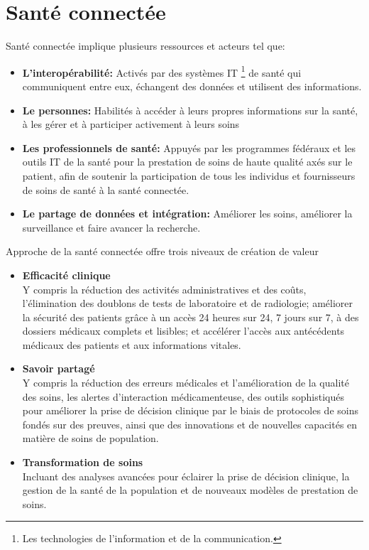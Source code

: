 \documentclass[12pt]{article}
\begin{document}
\section{Santé connectée}
Santé connectée implique plusieurs ressources et acteurs tel que:
\begin{itemize}
	\item \textbf{L’interopérabilité:} Activés par des systèmes IT \footnote{Les technologies de l'information et de la communication.} de santé qui communiquent entre eux, échangent des données et utilisent des informations.
	\item \textbf{Le personnes:} Habilités à accéder à leurs propres informations sur la santé, à les gérer et à participer activement à leurs soins
	\item \textbf{Les professionnels de santé:} Appuyés par les programmes fédéraux et les outils IT de la santé pour la prestation de soins de haute qualité axés sur le patient, afin de soutenir la participation de tous les individus et fournisseurs de soins de santé à la santé connectée.
	\item \textbf{Le partage de données et intégration:} Améliorer les soins, améliorer la surveillance et faire avancer la recherche.
\end{itemize}

Approche de la santé connectée offre trois niveaux de création de valeur
\begin{itemize}
	\item \textbf{Efficacité clinique}\\
	Y compris la réduction des activités administratives et des coûts, l’élimination des doublons de tests de laboratoire et de radiologie; améliorer la sécurité des patients grâce à un accès 24 heures sur 24, 7 jours sur 7, à des dossiers médicaux complets et lisibles; et accélérer l'accès aux antécédents médicaux des patients et aux informations vitales.
	\item \textbf{Savoir partagé}\\
	Y compris la réduction des erreurs médicales et l'amélioration de la qualité des soins, les alertes d'interaction médicamenteuse, des outils sophistiqués pour améliorer la prise de décision clinique par le biais de protocoles de soins fondés sur des preuves, ainsi que des innovations et de nouvelles capacités en matière de soins de population.
	\item \textbf{Transformation de soins}\\
	Incluant des analyses avancées pour éclairer la prise de décision clinique, la gestion de la santé de la population et de nouveaux modèles de prestation de soins.
\end{itemize}
\newpage
\end{document}
